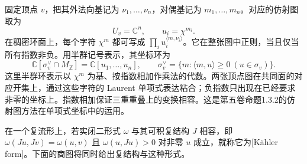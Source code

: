 固定顶点 \(v\)，把其外法向基记为 \(\nu_1,\ldots,\nu_n\)，对偶基记为 \(m_1,\ldots,m_n\)。对应的仿射图取为
\[
	U_v=\mathbb C^n,\qquad u_i=\chi^{m_i}.
\]
在稠密环面上，每个字符 \(\chi^m\) 都可写成 \(\prod_i u_i^{\langle m,\nu_i\rangle}\)。它在整张图中正则，当且仅当所有指数非负。用半群记号表示，其坐标环为
\[
	\mathbb C[\sigma_v^\vee\cap M_{\mathbb Z}]
	=\mathbb C[u_1,\ldots,u_n],
	\qquad
	\sigma_v^\vee=\{m:\langle m,u\rangle\ge0\ (u\in\sigma_v)\}.
\]
这里半群环表示以 \(\chi^m\) 为基、按指数相加作乘法的代数。两张顶点图在共同面的对应开集上，通过这些字符的 Laurent 单项式表达粘合；负指数只出现在已经要求非零的坐标上。指数相加保证三重重叠上的变换相容。这是第五卷命题1.3.2的仿射图方法在单项式坐标中的运用。

在一个复流形上，若实闭二形式 \(\omega\) 与其可积复结构 \(J\) 相容，即
\(\omega(Ju,Jv)=\omega(u,v)\) 且 \(\omega(u,Ju)>0\) 对非零 \(u\) 成立，就称它为[Kähler form]。下面的商图将同时给出复结构与这种形式。

